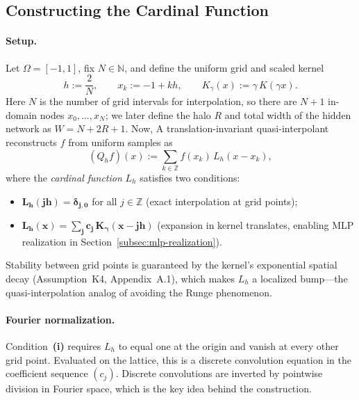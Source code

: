 \documentclass{article}
\begin{document}
\subsection{Constructing the Cardinal Function}
\label{subsec:fourier-normalized}

\paragraph{Setup.}
Let \(\Omega=[-1,1]\), fix \(N\in\mathbb{N}\), and define the uniform grid and scaled kernel
\begin{equation}
  h := \frac{2}{N},
  \qquad
  x_k := -1 + kh,
  \qquad
  K_\gamma(x) := \gamma\,K(\gamma x).
  \label{eq:grid-kernel}
\end{equation}
Here \(N\) is the number of grid intervals for interpolation, so there are \(N+1\) in-domain nodes \(x_0,\ldots,x_N\); we later define the halo \(R\) and total width of the hidden network as \(W = N + 2R + 1\). Now, A translation-invariant quasi-interpolant reconstructs \(f\) from uniform samples as
\begin{equation}
  (Q_h f)(x) := \sum_{k\in\mathbb{Z}} f(x_k)\,L_h(x - x_k),
  \label{eq:Qh}
\end{equation}
where the \emph{cardinal function} \(L_h\) satisfies two conditions:
\begin{itemize}
  \item[\textbf{(i)}] \(\boldsymbol{L_h(jh) = \delta_{j,0}}\) for all \(j\in\mathbb{Z}\) (exact interpolation at grid points);
  \item[\textbf{(ii)}] \(\boldsymbol{L_h(x) = \sum_j c_j\,K_\gamma(x-jh)}\) (expansion in kernel translates, enabling MLP realization in Section~\ref{subsec:mlp-realization}).
\end{itemize}
Stability between grid points is guaranteed by the kernel's exponential spatial decay (Assumption~K4, Appendix~A.1), which makes \(L_h\) a localized bump---the quasi-interpolation analog of avoiding the Runge phenomenon.

\paragraph{Fourier normalization.}
Condition~\textbf{(i)} requires \(L_h\) to equal one at the origin and vanish at every other grid point.  Evaluated on the lattice, this is a discrete convolution equation in the coefficient sequence \((c_j)\).  Discrete convolutions are inverted by pointwise division in Fourier space, which is the key idea behind the construction.
\end{document}
